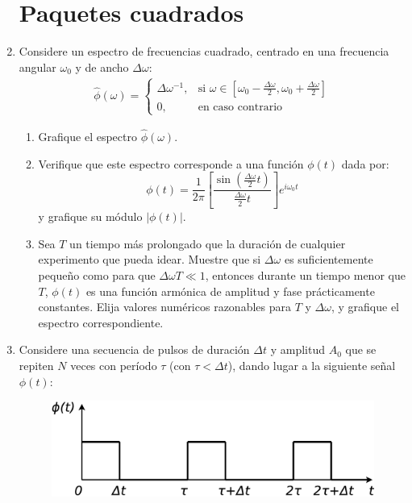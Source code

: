 \documentclass[11pt,spanish]{article}
\begin{document}
\begin{enumerate}
\section*{Paquetes cuadrados}


    \item Considere un espectro de frecuencias cuadrado, centrado en una
    frecuencia angular $\omega_0$ y de ancho $\Delta\omega$:
    \begin{align}\hat{\phi}(\omega) =
        \begin{cases}
            \Delta\omega^{-1}, & \text{si } \omega \in [\omega_0 - \frac{\Delta\omega}{2}, \omega_0 + \frac{\Delta\omega}{2}] \\
            0, & \text{en caso contrario}
        \end{cases}
    \end{align}

    \begin{enumerate}
        \item Grafique el espectro $\hat{\phi}(\omega)$.
        
        \item Verifique que este espectro corresponde a una función $\phi(t)$
        dada por: 
        \[
        \phi(t)=\frac{1}{2\pi}\left[\frac{\sin(\tfrac{\Delta\omega}{2} t )}{\tfrac{\Delta\omega}{2} t}\right]e^{i\omega_{0}t}
        \]
        y grafique su módulo $\left|\phi(t)\right|$.

        \item Sea $T$ un tiempo más prolongado que la duración de cualquier
        experimento que pueda idear. Muestre que si $\Delta\omega$ es
        suficientemente pequeño como para que $\Delta\omega T\ll1$, entonces
        durante un tiempo menor que $T$, $\phi(t)$ es una función armónica de
        amplitud y fase prácticamente constantes. Elija valores numéricos razonables para $T$ y $\Delta \omega$, y grafique el espectro correspondiente.
    \end{enumerate}



    \item Considere una secuencia de pulsos de duración $\Delta t$ y amplitud
    $A_0$ que se repiten $N$ veces con período $\tau$ (con $\tau < \Delta t$),
    dando lugar a la siguiente señal $\phi(t)$:

    \begin{figure}[H]
        \centering{}\includegraphics[clip,scale=0.25]{figs/ej2-18}
    \end{figure}


\end{enumerate}
\end{document}
